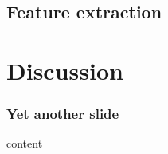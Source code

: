 \documentclass[t,12pt,pdftex]{beamer}
\begin{document}
\subsection{Feature extraction}

\section{Discussion}

\begin{frame}
	\frametitle{Yet another slide}
	
	content
\end{frame}
\end{document}
